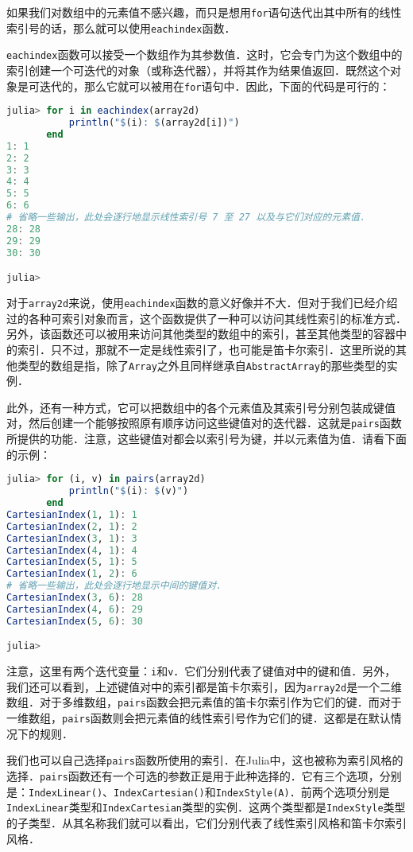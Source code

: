 如果我们对数组中的元素值不感兴趣，而只是想用\verb|for|语句迭代出其中所有的线性索引号的话，那么就可以使用\verb|eachindex|函数．

\verb|eachindex|函数可以接受一个数组作为其参数值．这时，它会专门为这个数组中的索引创建一个可迭代的对象（或称迭代器），并将其作为结果值返回．既然这个对象是可迭代的，那么它就可以被用在\verb|for|语句中．因此，下面的代码是可行的：

\begin{lstlisting}[language=julia]
julia> for i in eachindex(array2d)
           println("$(i): $(array2d[i])")
       end
1: 1
2: 2
3: 3
4: 4
5: 5
6: 6
# 省略一些输出，此处会逐行地显示线性索引号 7 至 27 以及与它们对应的元素值．
28: 28
29: 29
30: 30

julia> 
\end{lstlisting}

对于\verb|array2d|来说，使用\verb|eachindex|函数的意义好像并不大．但对于我们已经介绍过的各种可索引对象而言，这个函数提供了一种可以访问其线性索引的标准方式．另外，该函数还可以被用来访问其他类型的数组中的索引，甚至其他类型的容器中的索引．只不过，那就不一定是线性索引了，也可能是笛卡尔索引．这里所说的其他类型的数组是指，除了\verb|Array|之外且同样继承自\verb|AbstractArray|的那些类型的实例．

此外，还有一种方式，它可以把数组中的各个元素值及其索引号分别包装成键值对，然后创建一个能够按照原有顺序访问这些键值对的迭代器．这就是\verb|pairs|函数所提供的功能．注意，这些键值对都会以索引号为键，并以元素值为值．请看下面的示例：

\begin{lstlisting}[language=julia]
julia> for (i, v) in pairs(array2d)
           println("$(i): $(v)")
       end
CartesianIndex(1, 1): 1
CartesianIndex(2, 1): 2
CartesianIndex(3, 1): 3
CartesianIndex(4, 1): 4
CartesianIndex(5, 1): 5
CartesianIndex(1, 2): 6
# 省略一些输出，此处会逐行地显示中间的键值对．
CartesianIndex(3, 6): 28
CartesianIndex(4, 6): 29
CartesianIndex(5, 6): 30

julia> 
\end{lstlisting}

注意，这里有两个迭代变量：\verb|i|和\verb|v|．它们分别代表了键值对中的键和值．另外，我们还可以看到，上述键值对中的索引都是笛卡尔索引，因为\verb|array2d|是一个二维数组．对于多维数组，\verb|pairs|函数会把元素值的笛卡尔索引作为它们的键．而对于一维数组，\verb|pairs|函数则会把元素值的线性索引号作为它们的键．这都是在默认情况下的规则．

我们也可以自己选择\verb|pairs|函数所使用的索引．在Julia中，这也被称为索引风格的选择．\verb|pairs|函数还有一个可选的参数正是用于此种选择的．它有三个选项，分别是：\verb|IndexLinear()|、\verb|IndexCartesian()|和\verb|IndexStyle(A)|．前两个选项分别是\verb|IndexLinear|类型和\verb|IndexCartesian|类型的实例．这两个类型都是\verb|IndexStyle|类型的子类型．从其名称我们就可以看出，它们分别代表了线性索引风格和笛卡尔索引风格．

